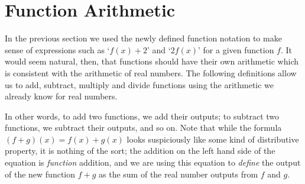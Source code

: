 \section{Function Arithmetic}
\label{FunctionArithmetic}

In the previous section we used the newly defined function notation to make sense of expressions such as `$f(x) + 2$' and `$2f(x)$' for a given function $f$.  It would seem natural, then, that functions should have their own arithmetic which is consistent with the arithmetic of real numbers.  The following definitions allow us to add, subtract, multiply and divide functions using the arithmetic we already know for real numbers.

\smallskip


\smallskip

In other words, to add two functions, we add their outputs;  to subtract two functions, we subtract their outputs, and so on.  Note that while the formula $(f+g)(x) = f(x) + g(x)$ looks suspiciously like some kind of distributive property, it is nothing of the sort;  the addition on the left hand side of the equation is \textit{function} addition, and we are using this equation to \textit{define} the output of the new function $f+g$ as the sum of the real number outputs from $f$ and $g$.

